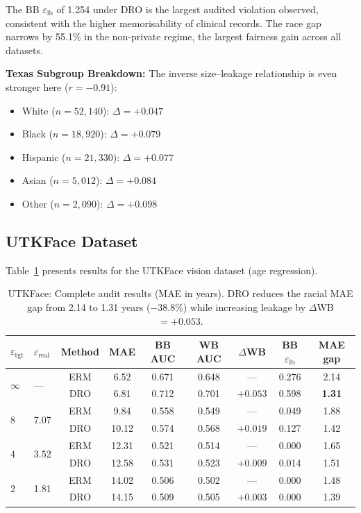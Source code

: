 \documentclass[11pt, a4paper]{article}
\begin{document}
The BB $\varepsilon_{\text{lb}}$ of 1.254 under DRO is the largest audited violation observed, consistent with the higher memorisability of clinical records. The race gap narrows by 55.1\% in the non-private regime, the largest fairness gain across all datasets.

\textbf{Texas Subgroup Breakdown:} The inverse size--leakage relationship is even stronger here ($r = -0.91$):
\begin{itemize}
    \item White ($n=52{,}140$): $\Delta = +0.047$
    \item Black ($n=18{,}920$): $\Delta = +0.079$
    \item Hispanic ($n=21{,}330$): $\Delta = +0.077$
    \item Asian ($n=5{,}012$): $\Delta = +0.084$
    \item Other ($n=2{,}090$): $\Delta = +0.098$
\end{itemize}

\subsection{UTKFace Dataset}

Table~\ref{tab:utkface} presents results for the UTKFace vision dataset (age regression).

\begin{table}[ht]
\centering
\caption{UTKFace: Complete audit results (MAE in years). DRO reduces the racial MAE gap from 2.14 to 1.31 years ($-38.8\%$) while increasing leakage by $\Delta$WB $= +0.053$.}
\label{tab:utkface}
\small
\begin{tabular}{@{}ll c c c c c c c@{}}
\toprule
$\varepsilon_{\text{tgt}}$ & $\varepsilon_{\text{real}}$ & Method & MAE & BB AUC & WB AUC & $\Delta$WB & BB $\varepsilon_{\text{lb}}$ & MAE gap \\
\midrule
\multirow{2}{*}{$\infty$} 
 & \multirow{2}{*}{---} 
 & ERM & 6.52 & 0.671 & 0.648 & --- & 0.276 & 2.14 \\
 & & DRO & 6.81 & 0.712 & 0.701 & $\mathbf{+0.053}$ & 0.598 & \textbf{1.31} \\
\midrule
\multirow{2}{*}{8} 
 & \multirow{2}{*}{7.07} 
 & ERM & 9.84 & 0.558 & 0.549 & --- & 0.049 & 1.88 \\
 & & DRO & 10.12 & 0.574 & 0.568 & $+0.019$ & 0.127 & 1.42 \\
\midrule
\multirow{2}{*}{4} 
 & \multirow{2}{*}{3.52} 
 & ERM & 12.31 & 0.521 & 0.514 & --- & 0.000 & 1.65 \\
 & & DRO & 12.58 & 0.531 & 0.523 & $+0.009$ & 0.014 & 1.51 \\
\midrule
\multirow{2}{*}{2} 
 & \multirow{2}{*}{1.81} 
 & ERM & 14.02 & 0.506 & 0.502 & --- & 0.000 & 1.48 \\
 & & DRO & 14.15 & 0.509 & 0.505 & $+0.003$ & 0.000 & 1.39 \\
\bottomrule
\end{tabular}
\end{table}
\end{document}
